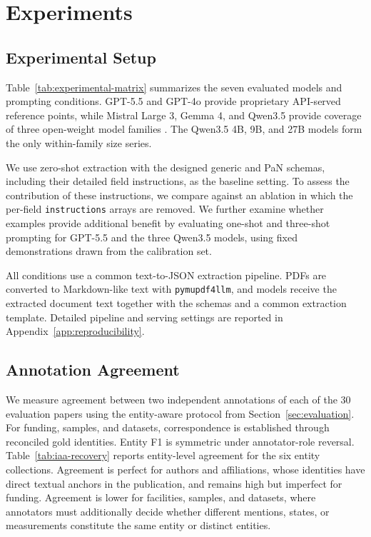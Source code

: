 \section{Experiments}
\label{sec:experiments}

\subsection{Experimental Setup}
\label{sec:experimental-setup}

Table~\ref{tab:experimental-matrix} summarizes the seven evaluated models and
prompting conditions. GPT-5.5 and GPT-4o provide proprietary API-served
reference points, while Mistral Large 3, Gemma 4, and Qwen3.5 provide coverage
of three open-weight model families
\citep{openai2026gpt55,openai2024gpt4o,mistral2025mistral3,
gemmateam2026gemma4,qwenteam2026qwen35}.
The Qwen3.5 4B, 9B, and 27B models form the only within-family size series.



We use zero-shot extraction with the designed generic and PaN schemas,
including their detailed field instructions, as the baseline setting. To
assess the contribution of these instructions, we compare against an
ablation in which the per-field \texttt{instructions} arrays are removed.
We further examine whether examples provide additional benefit by
evaluating one-shot and three-shot prompting for GPT-5.5 and the three
Qwen3.5 models, using fixed demonstrations drawn from the calibration set.

All conditions use a common text-to-JSON extraction pipeline. PDFs are
converted to Markdown-like text with \texttt{pymupdf4llm}, and models receive
the extracted document text together with the schemas and a common extraction
template. Detailed pipeline and serving settings are reported in
Appendix~\ref{app:reproducibility}.

\subsection{Annotation Agreement}
\label{sec:annotation-agreement}

We measure agreement between two independent annotations of each of the 30
evaluation papers using the entity-aware protocol from
Section~\ref{sec:evaluation}. For funding, samples, and datasets, correspondence 
is established through reconciled gold identities. Entity F1 is symmetric under 
annotator-role reversal. Table~\ref{tab:iaa-recovery} reports entity-level agreement 
for the six entity collections. Agreement is perfect for authors and affiliations, 
whose identities  have direct textual anchors in the publication, and remains high 
but imperfect for funding. Agreement is lower for facilities, samples, and datasets, 
where  annotators must additionally decide whether different mentions, states, or 
measurements constitute the same entity or distinct entities.

